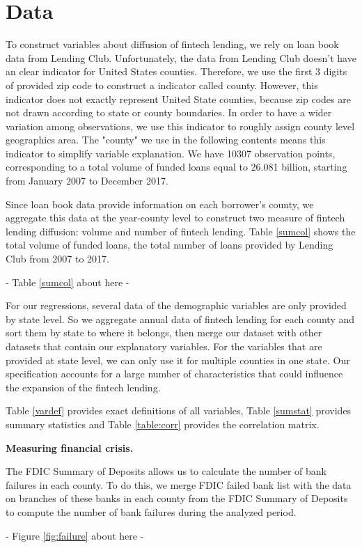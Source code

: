 \documentclass[11pt, a4paper, leqno]{article}
\begin{document}
\section{Data}
To construct variables about diffusion of fintech lending, we rely on loan book data from Lending Club. Unfortunately, the data from Lending Club doesn't have an clear indicator for United States counties. Therefore, we use the first 3 digits of provided zip code to construct a indicator called county. However, this indicator does not exactly represent United State counties, because zip codes are not drawn according to state or county boundaries. In order to have a wider variation among observations, we use this indicator to roughly assign county level geographics area. The "county" we use in the following contents means this indicator to simplify variable explanation. We have 10307 observation points, corresponding to a total volume of funded loans equal to 26.081 billion, starting from January 2007 to December 2017. 

Since loan book data provide information on each borrower's county, we aggregate this data at the year-county level to construct two measure of fintech lending diffusion: volume and number of fintech lending.
Table \ref{sumcol} shows the total volume of funded loans, the total number of loans provided by Lending Club from 2007 to 2017.
\begin{center}
- Table \ref{sumcol} about here -
\end{center}

For our regressions, several data of the demographic variables are only provided by state level. So we aggregate annual data of fintech lending for each county and sort them by state to where it belongs, then merge our dataset with other datasets that contain our explanatory variables. For the variables that are provided at state level, we can only use it for multiple counties in one state.  Our specification accounts for a large number of characteristics that could influence the expansion of the fintech lending. 

Table \ref{vardef} provides exact definitions of all variables, Table \ref{sumstat} provides summary statistics and Table \ref{table:corr} provides the correlation matrix.
 
\textbf{Measuring financial crisis.}

The FDIC Summary of Deposits allows us to calculate the number of bank failures in each county. To do this, we merge FDIC failed bank list with the data on branches of these banks in each county from the FDIC Summary of Deposits to compute the number of bank failures during the analyzed period. 
\begin{center}
- Figure \ref{fig:failure} about here -
\end{center}
\end{document}
